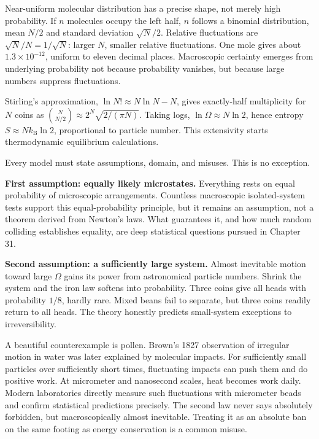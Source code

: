 \begin{challenge}
Near-uniform molecular distribution has a precise shape, not merely high probability. If \(n\) molecules occupy the left half, \(n\) follows a binomial distribution, mean \(N/2\) and standard deviation \(\sqrt{N}/2\). Relative fluctuations are \(\sqrt{N}/N=1/\sqrt{N}\): larger \(N\), smaller relative fluctuations. One mole gives about \(1.3\times10^{-12}\), uniform to eleven decimal places. Macroscopic certainty emerges from underlying probability not because probability vanishes, but because large numbers suppress fluctuations.

Stirling's approximation, \(\ln N!\approx N\ln N-N\), gives exactly-half multiplicity for \(N\) coins as \(\binom{N}{N/2}\approx 2^{N}\sqrt{2/(\pi N)}\). Taking logs, \(\ln\Omega\approx N\ln 2\), hence entropy \(S\approx N k_{\mathrm{B}}\ln 2\), proportional to particle number. This extensivity starts thermodynamic equilibrium calculations.
\end{challenge}


Every model must state assumptions, domain, and misuses. This is no exception.

\textbf{First assumption: equally likely microstates.} Everything rests on equal probability of microscopic arrangements. Countless macroscopic isolated-system tests support this equal-probability principle, but it remains an assumption, not a theorem derived from Newton's laws. What guarantees it, and how much random colliding establishes equality, are deep statistical questions pursued in Chapter 31.

\textbf{Second assumption: a sufficiently large system.} Almost inevitable motion toward large \(\Omega\) gains its power from astronomical particle numbers. Shrink the system and the iron law softens into probability. Three coins give all heads with probability \(1/8\), hardly rare. Mixed beans fail to separate, but three coins readily return to all heads. The theory honestly predicts small-system exceptions to irreversibility.

A beautiful counterexample is pollen. Brown's 1827 observation of irregular motion in water was later explained by molecular impacts. For sufficiently small particles over sufficiently short times, fluctuating impacts can push them and do positive work. At micrometer and nanosecond scales, heat becomes work daily. Modern laboratories directly measure such fluctuations with micrometer beads and confirm statistical predictions precisely. The second law never says absolutely forbidden, but macroscopically almost inevitable. Treating it as an absolute ban on the same footing as energy conservation is a common misuse.

